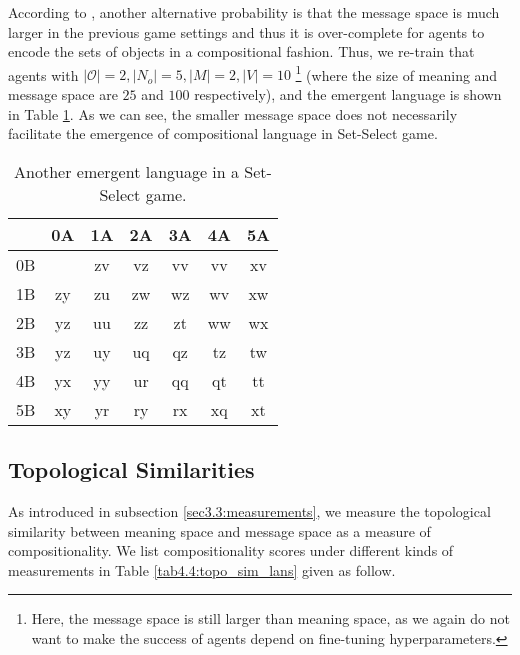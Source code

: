 According to \cite{kottur2017natural}, another alternative probability is that the message space is much larger in the previous game settings and thus it is over-complete for agents to encode the sets of objects in a compositional fashion. Thus, we re-train that agents with $|\mathcal{O}|=2, |N_o|=5, |M|=2, |V|=10$ \footnote{Here, the message space is still larger than meaning space, as we again do not want to make the success of agents depend on fine-tuning hyperparameters.} (where the size of meaning and message space are $25$ and $100$ respectively), and the emergent language is shown in Table \ref{tab4.4:emregent_language_referential2}. As we can see, the smaller message space does not necessarily facilitate the emergence of compositional language in Set-Select game.

\begin{table}[!h]
    \centering
    \begin{tabular}{|c|c|c|c|c|c|c|}
        \hline
           & 0A & 1A & 2A & 3A & 4A & 5A \\ \hline
        0B &    & zv & vz & vv & vv & xv \\ \hline
        1B & zy & zu & zw & wz & wv & xw \\ \hline
        2B & yz & uu & zz & zt & ww & wx \\ \hline
        3B & yz & uy & uq & qz & tz & tw \\ \hline
        4B & yx & yy & ur & qq & qt & tt \\ \hline
        5B & xy & yr & ry & rx & xq & xt \\ \hline
        \end{tabular}
    \caption{Another emergent language in a Set-Select game.}
    \label{tab4.4:emregent_language_referential2}
\end{table}

\subsection{Topological Similarities}
\label{ssec4.2.2:topo_sim}

As introduced in subsection \ref{sec3.3:measurements}, we measure the topological similarity between meaning space and message space as a measure of compositionality. We list compositionality scores under different kinds of measurements in Table \ref{tab4.4:topo_sim_lans} given as follow.

